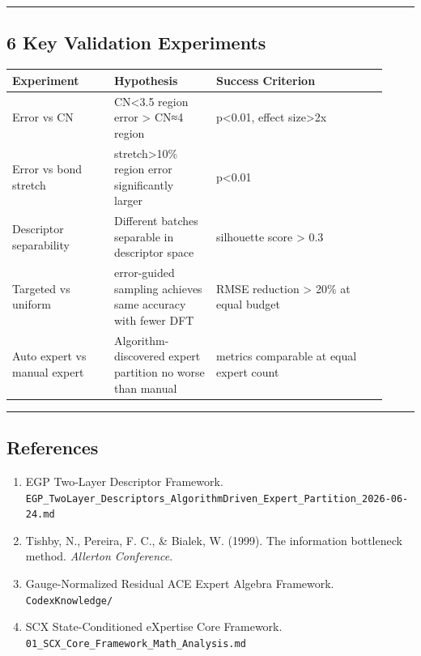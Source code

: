 \documentclass[
  12pt,
]{article}
\providecommand{\tightlist}{%
  \setlength{\itemsep}{0pt}\setlength{\parskip}{0pt}}
\begin{document}
\begin{center}\rule{0.5\linewidth}{0.5pt}\end{center}

\subsection{6 Key Validation Experiments}\label{key-validation-experiments}

\begin{longtable}[]{@{}p{0.25\linewidth}p{0.25\linewidth}p{0.42\linewidth}@{}}
\toprule\noalign{}
\begin{minipage}[b]{\linewidth}\raggedright
Experiment
\end{minipage} & \begin{minipage}[b]{\linewidth}\raggedright
Hypothesis
\end{minipage} & \begin{minipage}[b]{\linewidth}\raggedright
Success Criterion
\end{minipage} \\
\midrule\noalign{}
\endhead
\bottomrule\noalign{}
\endlastfoot
Error vs CN & CN<3.5 region error > CN≈4 region &
p<0.01, effect size>2x \\
Error vs bond stretch & stretch>10\% region error significantly larger &
p<0.01 \\
Descriptor separability & Different batches separable in descriptor space & silhouette score > 0.3 \\
Targeted vs uniform & error-guided sampling achieves same accuracy with fewer DFT & RMSE reduction > 20\% at equal budget \\
Auto expert vs manual expert & Algorithm-discovered expert partition no worse than manual & metrics comparable at equal expert count \\
\end{longtable}

\begin{center}\rule{0.5\linewidth}{0.5pt}\end{center}

\subsection{References}\label{references-prop6}

\begin{enumerate}
\def\labelenumi{\arabic{enumi}.}
\tightlist
\item
  EGP Two-Layer Descriptor Framework.
  \texttt{EGP\_TwoLayer\_Descriptors\_AlgorithmDriven\_Expert\_Partition\_2026-06-24.md}
\item
  Tishby, N., Pereira, F. C., \& Bialek, W. (1999). The information
  bottleneck method. \emph{Allerton Conference}.
\item
  Gauge-Normalized Residual ACE Expert Algebra Framework.
  \texttt{CodexKnowledge/}
\item
  SCX State-Conditioned eXpertise Core Framework.
  \texttt{01\_SCX\_Core\_Framework\_Math\_Analysis.md}
\end{enumerate}
\end{document}

